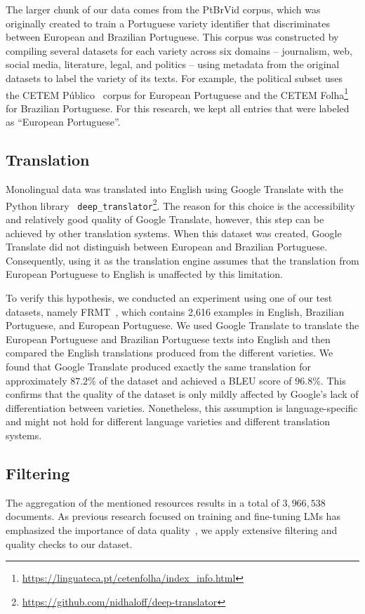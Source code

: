 The larger chunk of our data comes from the PtBrVid corpus, which was originally created to train a Portuguese variety identifier that discriminates between European and Brazilian Portuguese. 
This corpus was constructed by compiling several datasets for each variety across six domains -- journalism, web, social media, literature, legal, and politics -- using metadata from the original datasets to label the variety of its texts. 
For example, the political subset uses the CETEM Público~\cite{Rocha2000} corpus for European Portuguese and the CETEM Folha\footnote{\url{https://linguateca.pt/cetenfolha/index_info.html}} for Brazilian Portuguese. 
For this research, we kept all entries that were labeled as ``European Portuguese''.

\subsection{Translation}

Monolingual data was translated into English using Google Translate with the Python library \texttt{ deep\_translator}\footnote{\url{https://github.com/nidhaloff/deep-translator}}. The reason for this choice is the accessibility and relatively good quality of Google Translate, however, this step can be achieved by other translation systems. When this dataset was created, Google Translate did not distinguish between European and Brazilian Portuguese. Consequently, using it as the translation engine assumes that the translation from European Portuguese to English is unaffected by this limitation. 

To verify this hypothesis, we conducted an experiment using one of our test datasets, namely FRMT~\cite{Riley2023}, which contains 2,616 examples in English, Brazilian Portuguese, and European Portuguese.  We used Google Translate to translate the European Portuguese and Brazilian Portuguese texts into English and then compared the English translations produced from the different varieties.  We found that Google Translate produced exactly the same translation for approximately $87.2\%$ of the dataset and achieved a BLEU score of $96.8\%$.  This confirms that the quality of the dataset is only mildly affected by Google’s lack of differentiation between varieties. Nonetheless, this assumption is language-specific and might not hold for different language varieties and different translation systems. 


\subsection{Filtering}
The aggregation of the mentioned resources results in a total of $3,966,538$ documents. 
As previous research focused on training and fine-tuning LMs has emphasized the importance of data quality~\cite{Wenzek2020,Penedo2024}, we apply extensive filtering and quality checks to our dataset. 

